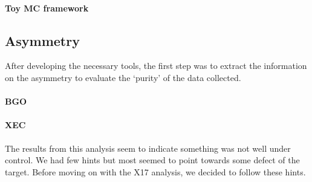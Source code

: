 \begin{refsection}
        \paragraph{Toy MC framework}

    \subsection{Asymmetry}
        After developing the necessary tools, the first step was to extract the information on the asymmetry to evaluate the `purity' of the data collected.
        
        \paragraph{BGO}
        \paragraph{XEC}

        \noindent
        The results from this analysis seem to indicate something was not well under control.
        We had few hints but most seemed to point towards some defect of the target. 
        Before moving on with the X17 analysis, we decided to follow these hints.
        

\end{refsection}
